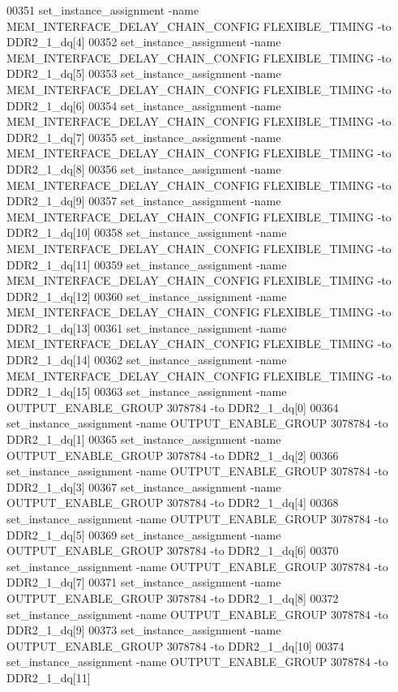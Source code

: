 \begin{DoxyCode}
00351 set\_instance\_assignment -name MEM\_INTERFACE\_DELAY\_CHAIN\_CONFIG FLEXIBLE\_TIMING -to DDR2\_1\_dq[4]
00352 set\_instance\_assignment -name MEM\_INTERFACE\_DELAY\_CHAIN\_CONFIG FLEXIBLE\_TIMING -to DDR2\_1\_dq[5]
00353 set\_instance\_assignment -name MEM\_INTERFACE\_DELAY\_CHAIN\_CONFIG FLEXIBLE\_TIMING -to DDR2\_1\_dq[6]
00354 set\_instance\_assignment -name MEM\_INTERFACE\_DELAY\_CHAIN\_CONFIG FLEXIBLE\_TIMING -to DDR2\_1\_dq[7]
00355 set\_instance\_assignment -name MEM\_INTERFACE\_DELAY\_CHAIN\_CONFIG FLEXIBLE\_TIMING -to DDR2\_1\_dq[8]
00356 set\_instance\_assignment -name MEM\_INTERFACE\_DELAY\_CHAIN\_CONFIG FLEXIBLE\_TIMING -to DDR2\_1\_dq[9]
00357 set\_instance\_assignment -name MEM\_INTERFACE\_DELAY\_CHAIN\_CONFIG FLEXIBLE\_TIMING -to DDR2\_1\_dq[10]
00358 set\_instance\_assignment -name MEM\_INTERFACE\_DELAY\_CHAIN\_CONFIG FLEXIBLE\_TIMING -to DDR2\_1\_dq[11]
00359 set\_instance\_assignment -name MEM\_INTERFACE\_DELAY\_CHAIN\_CONFIG FLEXIBLE\_TIMING -to DDR2\_1\_dq[12]
00360 set\_instance\_assignment -name MEM\_INTERFACE\_DELAY\_CHAIN\_CONFIG FLEXIBLE\_TIMING -to DDR2\_1\_dq[13]
00361 set\_instance\_assignment -name MEM\_INTERFACE\_DELAY\_CHAIN\_CONFIG FLEXIBLE\_TIMING -to DDR2\_1\_dq[14]
00362 set\_instance\_assignment -name MEM\_INTERFACE\_DELAY\_CHAIN\_CONFIG FLEXIBLE\_TIMING -to DDR2\_1\_dq[15]
00363 set\_instance\_assignment -name OUTPUT\_ENABLE\_GROUP \textcolor{vhdllogic}{3078784} -to DDR2\_1\_dq[0]
00364 set\_instance\_assignment -name OUTPUT\_ENABLE\_GROUP \textcolor{vhdllogic}{3078784} -to DDR2\_1\_dq[1]
00365 set\_instance\_assignment -name OUTPUT\_ENABLE\_GROUP \textcolor{vhdllogic}{3078784} -to DDR2\_1\_dq[2]
00366 set\_instance\_assignment -name OUTPUT\_ENABLE\_GROUP \textcolor{vhdllogic}{3078784} -to DDR2\_1\_dq[3]
00367 set\_instance\_assignment -name OUTPUT\_ENABLE\_GROUP \textcolor{vhdllogic}{3078784} -to DDR2\_1\_dq[4]
00368 set\_instance\_assignment -name OUTPUT\_ENABLE\_GROUP \textcolor{vhdllogic}{3078784} -to DDR2\_1\_dq[5]
00369 set\_instance\_assignment -name OUTPUT\_ENABLE\_GROUP \textcolor{vhdllogic}{3078784} -to DDR2\_1\_dq[6]
00370 set\_instance\_assignment -name OUTPUT\_ENABLE\_GROUP \textcolor{vhdllogic}{3078784} -to DDR2\_1\_dq[7]
00371 set\_instance\_assignment -name OUTPUT\_ENABLE\_GROUP \textcolor{vhdllogic}{3078784} -to DDR2\_1\_dq[8]
00372 set\_instance\_assignment -name OUTPUT\_ENABLE\_GROUP \textcolor{vhdllogic}{3078784} -to DDR2\_1\_dq[9]
00373 set\_instance\_assignment -name OUTPUT\_ENABLE\_GROUP \textcolor{vhdllogic}{3078784} -to DDR2\_1\_dq[10]
00374 set\_instance\_assignment -name OUTPUT\_ENABLE\_GROUP \textcolor{vhdllogic}{3078784} -to DDR2\_1\_dq[11]

\end{DoxyCode}
